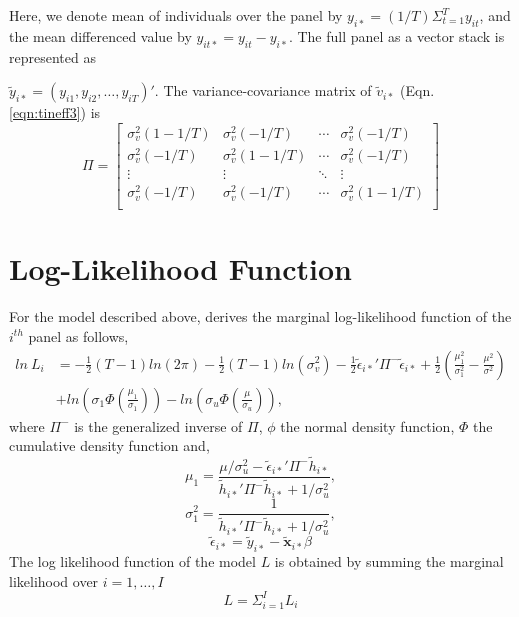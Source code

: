 Here, we denote mean of individuals over the panel by $y_{i*} = (1/T)\Sigma^{T}_{t=1}y_{it}$, and the mean differenced value by $y_{it*}=y_{it}-y_{i*}$. The full panel as a vector stack is represented as

$\tilde{y}_{i*} = (y_{i1},y_{i2},\ldots,y_{iT})'$. The variance-covariance matrix of $\tilde{v}_{i*}$ (Eqn. \ref{eqn:tineff3}) is
\begin{equation}
\label{eqn:mat}
\Pi = \begin{bmatrix}
\sigma^{2}_{v}(1-1/T) & \sigma^{2}_{v}(-1/T) &\cdots& \sigma^{2}_{v}(-1/T) \\
\sigma^{2}_{v}(-1/T) & \sigma^{2}_{v}(1-1/T) &\cdots& \sigma^{2}_{v}(-1/T) \\
\vdots & \vdots & \ddots & \vdots \\
\sigma^{2}_{v}(-1/T) & \sigma^{2}_{v}(-1/T) &\cdots& \sigma^{2}_{v}(1-1/T) \\
 \end{bmatrix} 
\end{equation}
\section{Log-Likelihood Function}
For the model described above, \cite{Wang2010} derives the marginal log-likelihood function of the $i^{th}$ panel as follows, 
\begin{equation}
\label{eqn:loglik}
\begin{split}
ln~L_{i} &= -\frac{1}{2}(T-1)ln(2\pi)-\frac{1}{2}(T-1)ln(\sigma^{2}_{v})-\frac{1}{2}\tilde{\epsilon}_{i*}'\Pi^{-}\tilde{\epsilon}_{i*}+\frac{1}{2}\left(\frac{\mu^{2}_{1}}{\sigma^{2}_{1}}-\frac{\mu^{2}}{\sigma^{2}}\right)\\
& +ln\left(\sigma_{1}\Phi\left(\frac{\mu_{1}}{\sigma_{1}}\right)\right) -ln\left(\sigma_{u}\Phi\left(\frac{\mu}{\sigma_{u}}\right)\right),
\end{split}
\end{equation}
where $\Pi^{-}$ is the generalized inverse of $\Pi$, $\phi$ the normal density function, $\Phi$ the cumulative density function and, 
\begin{equation}
\mu_{1}=\frac{\mu/\sigma_{u}^{2}-\tilde{\epsilon}_{i*}'\Pi^{-}\tilde{h}_{i*}}{\tilde{h}_{i*}'\Pi^{-}\tilde{h}_{i*} + 1/\sigma^{2}_{u}},
\end{equation}
\begin{equation}
\sigma_{1}^2=\frac{1}{\tilde{h}_{i*}'\Pi^{-}\tilde{h}_{i*} + 1/\sigma^{2}_{u}},
\end{equation}
\begin{equation}
\tilde{\epsilon}_{i*}=\tilde{y}_{i*}-\mathbf{\tilde{x}}_{i*}\beta
\end{equation}
The log likelihood function of the model $L$ is obtained by summing the marginal likelihood over $i=1,\ldots,I$
\begin{equation}
L=\Sigma^{I}_{i=1}L_{i}
\end{equation} 
